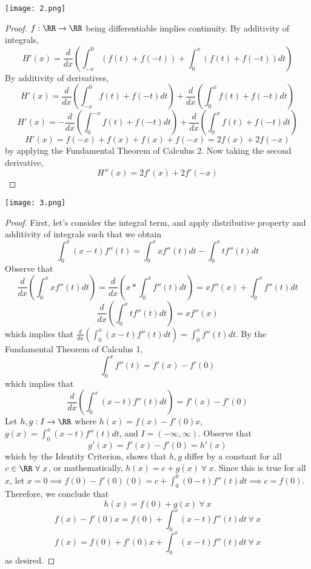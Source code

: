 \documentclass[12pt]{scrartcl}
\begin{document}
\newpage 

\texttt{[image: 2.png]}
\begin{proof}
  $f: \RR \to \RR$ being differentiable implies continuity. By additivity of integrals, 
  \[H'(x) = \frac{d}{dx}(\int_{-x}^0 (f(t) + f(-t)) + \int_0^x (f(t) + f(-t)) dt)\]
  By additivity of derivatives,
  \[H'(x) = \frac{d}{dx}(\int_{-x}^0 f(t) + f(-t) dt) + \frac{d}{dx}(\int_0^x f(t) + f(-t) dt)\]
  \[H'(x) = -\frac{d}{dx}(\int_0^{-x} f(t) + f(-t) dt) + \frac{d}{dx}(\int_0^x f(t) + f(-t) dt)\]
  \[H'(x) = f(-x) + f(x) + f(x) + f(-x) = 2f(x) + 2f(-x)\]
  by applying the Fundamental Theorem of Calculus 2. Now taking the second derivative, 
  \[H''(x) = 2f'(x) + 2f'(-x)\]
\end{proof}
\newpage 

\texttt{[image: 3.png]}
\begin{proof}
    First, let's consider the integral term, and apply distributive property and additivity of integrals such that we obtain
    \[\int_0^x (x-t)f''(t) = \int_0^x xf''(t) dt - \int_0^x tf''(t) dt\]
    Observe that 
    \[\frac{d}{dx}(\int_0^x x f''(t) dt) = \frac{d}{dx}(x * \int_0^x f''(t) dt) = xf''(x) + \int_0^x f''(t) dt\]
    \[\frac{d}{dx}(\int_0^x t f''(t) dt) = xf''(x)\]
    which implies that $\frac{d}{dx}(\int_0^ x (x-t)f''(t) dt) = \int_0^x f''(t) dt$. By the Fundamental Theorem of Calculus 1, 
    \[\int_0^x f''(t) = f'(x) - f'(0)\]
    which implies that 
    \[\frac{d}{dx}(\int_0^x (x-t)f''(t) dt) = f'(x) - f'(0)\]
    Let $h, g: I \to \RR$ where $h(x) = f(x) - f'(0)x$, $g(x) = \int_0^x (x-t)f''(t)dt$, and $I = (-\infty, \infty)$. Observe that 
    \[g'(x) = f'(x) - f'(0) = h'(x)\]
    which by the Identity Criterion, shows that $h, g$ differ by a constant for all $c \in \RR \ \forall \ x$, or mathematically, 
    $h(x) = c + g(x) \ \forall \ x$. Since this is true for all $x$, let $x = 0 \implies f(0) - f'(0)(0) = c + \int_0^0 (0-t)f''(t) dt \implies c = f(0)$.
    Therefore, we conclude that 
    \[h(x) = f(0) + g(x) \ \forall \ x\] 
    \[f(x) - f'(0)x = f(0) + \int_0^x (x-t)f''(t) dt \ \forall \ x\]
    \[f(x) = f(0) + f'(0)x + \int_0^x (x-t)f''(t) dt \ \forall \ x\]
    as desired.
\end{proof}
\newpage 
\end{document}

